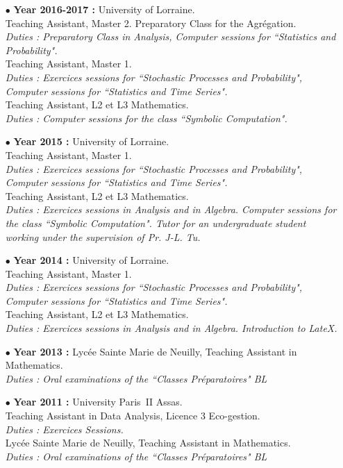 \documentclass[a4paper,11pt]{article}
\begin{document}
\begin{itemize}
\item[$\bullet$] \textbf{ Year 2016-2017 :} University of Lorraine.\\
					Teaching Assistant, Master 2. Preparatory Class for the Agrégation.\\
					\textit{Duties : Preparatory Class in Analysis, Computer sessions for ``Statistics and Probability".}\\
					Teaching Assistant, Master 1.\\
					\textit{Duties : Exercices sessions for ``Stochastic Processes and Probability", Computer sessions for ``Statistics and Time Series".}\\
					Teaching Assistant, L2 et L3 Mathematics. \\
					\textit{Duties : Computer sessions for the class ``Symbolic Computation".}\\   
\item[$\bullet$] \textbf{ Year 2015 :} University of Lorraine.\\
					Teaching Assistant, Master 1.\\
					\textit{Duties : Exercices sessions for ``Stochastic Processes and Probability", Computer sessions for ``Statistics and Time Series".}\\
					Teaching Assistant, L2 et L3 Mathematics. \\
					\textit{Duties : Exercices sessions in Analysis and in Algebra. Computer sessions for the class ``Symbolic Computation". Tutor for an undergraduate student working under the supervision of Pr. J-L. Tu.}\\   
					
\item[$\bullet$] \textbf{ Year 2014 :}  University of Lorraine.\\
					Teaching Assistant, Master 1. \\
					\textit{Duties : Exercices sessions for ``Stochastic Processes and Probability", Computer sessions for ``Statistics and Time Series".}\\
					Teaching Assistant, L2 et L3 Mathematics. \\
					\textit{Duties : Exercices sessions in Analysis and in Algebra. Introduction to LateX.}\\
\item[$\bullet$] \textbf{ Year 2013 :} Lycée Sainte Marie de Neuilly, Teaching Assistant in Mathematics. \\
					\textit{Duties : Oral examinations of the ``Classes Préparatoires" BL} \\
\item[$\bullet$] \textbf{ Year 2011 :} University Paris~II Assas.\\
					Teaching Assistant in Data Analysis, Licence 3 Eco-gestion.\\
					\textit{Duties : Exercices Sessions.}\\
					Lycée Sainte Marie de Neuilly, Teaching Assistant in Mathematics. \\
					\textit{Duties : Oral examinations of the ``Classes Préparatoires" BL} 
\end{itemize}
\end{document}
